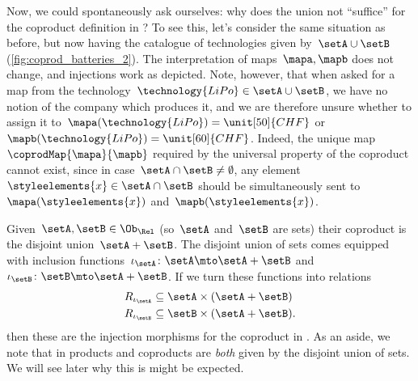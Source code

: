 \begin{example}
    Now, we could spontaneously ask ourselves: why does the union not ``suffice'' for the coproduct definition in \Set?
    To see this, let's consider the same situation as before, but now having the catalogue of technologies given by~$\setA\cup \setB$ (\cref{fig:coprod_batteries_2}).
    The interpretation of maps~$\mapa,\mapb$ does not change, and injections work as depicted.
    Note, however, that when asked for a map from the technology~$\technology{LiPo}\in \setA\cup \setB$, we have no notion of the company which produces it, and we are therefore unsure whether to assign it to~$\mapa(\technology{LiPo})=\unit[50]{CHF}$ or~$\mapb(\technology{LiPo})=\unit[60]{CHF}$.
    Indeed, the unique map~$\coprodMap{\mapa}{\mapb}$ required by the universal property of the coproduct cannot exist, since in case~$\setA\cap \setB\neq \emptyset$, any element~$\styleelements{x}\in \setA\cap \setB$ should be simultaneously sent to~$\mapa(\styleelements{x})$ and~$\mapb(\styleelements{x})$.

\end{example}


\begin{example}
    Given~$\setA,\setB\in \Ob_\Rel$ (so~$\setA$ and~$\setB$ are sets) their coproduct is the disjoint union~$\setA+\setB$.
    The disjoint union of sets comes equipped with inclusion functions~$\iota_\setA\colon \setA\mto \setA+\setB$ and~$\iota_\setB\colon \setB\mto \setA+\setB$.
    If we turn these functions into relations
    \begin{equation*}
        \begin{aligned}
            R_{\iota_\setA}&\subseteq \setA\times (\setA+\setB)\\
            R_{\iota_\setB}&\subseteq \setB\times (\setA+\setB).
        \end{aligned}
    \end{equation*}
    then these are the injection morphisms for the coproduct in \Rel.
    As an aside, we note that in \Rel products and coproducts are \emph{both} given by the disjoint union of sets.
    We will see later why this is might be expected.
\end{example}


